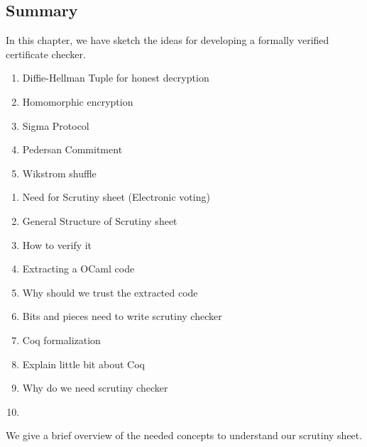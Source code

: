 \begin{Definition}
\section{Summary}
In this chapter, we have sketch the ideas for developing a formally verified certificate checker. 

\begin{enumerate}
\item Diffie-Hellman Tuple for honest decryption
\item Homomorphic encryption
\item Sigma Protocol
\item Pedersan Commitment 
\item Wikstrom shuffle 
\end{enumerate}





\begin{enumerate}
\item Need for Scrutiny sheet (Electronic voting)
\item General Structure of Scrutiny sheet
\item How to verify it
\item Extracting a OCaml code
\item Why should we trust the extracted code
\item Bits and pieces need to write scrutiny checker
\item Coq formalization
\item Explain little bit about Coq
\item Why do we need scrutiny checker
\item 
\end{enumerate}



We give a brief overview of the needed concepts to understand our scrutiny sheet.


























        

  

\end{Definition}
